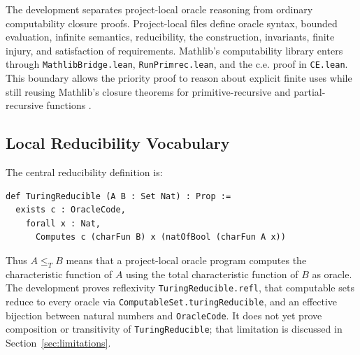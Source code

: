 The development separates project-local oracle reasoning from ordinary
computability closure proofs.  Project-local files define oracle syntax,
bounded evaluation, infinite semantics, reducibility, the construction,
invariants, finite injury, and satisfaction of requirements.  Mathlib's
computability library enters through \texttt{MathlibBridge.lean},
\texttt{RunPrimrec.lean}, and the c.e. proof in \texttt{CE.lean}.  This
boundary allows the priority proof to reason about explicit finite uses
while still reusing Mathlib's closure theorems for primitive-recursive and
partial-recursive functions \cite{carneiro2019,mathlibPartrec}.

\subsection{Local Reducibility Vocabulary}

The central reducibility definition is:

\begin{lstlisting}
def TuringReducible (A B : Set Nat) : Prop :=
  exists c : OracleCode,
    forall x : Nat,
      Computes c (charFun B) x (natOfBool (charFun A x))
\end{lstlisting}

Thus \(A\leq_T B\) means that a project-local oracle program computes the
characteristic function of \(A\) using the total characteristic function of
\(B\) as oracle.  The development proves reflexivity
\texttt{TuringReducible.refl}, that computable sets reduce to every oracle
via \texttt{ComputableSet.turingReducible}, and an effective bijection
between natural numbers and \texttt{OracleCode}.  It does not yet prove
composition or transitivity of \texttt{TuringReducible}; that limitation is
discussed in Section~\ref{sec:limitations}.

